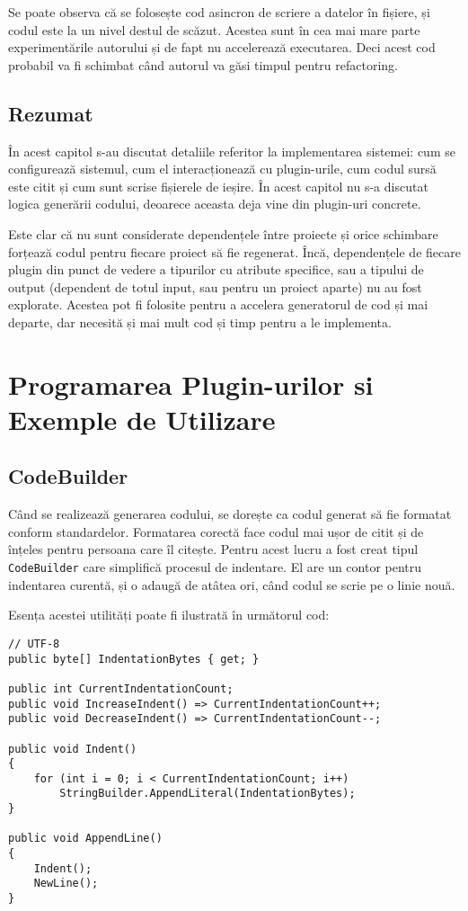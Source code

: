 \documentclass[a4paper,12pt]{report}
\begin{document}
Se poate observa că se folosește cod asincron de scriere a datelor în fișiere, și codul este la un nivel destul de scăzut.
Acestea sunt în cea mai mare parte experimentările autorului și de fapt nu accelerează executarea.
Deci acest cod probabil va fi schimbat când autorul va găsi timpul pentru refactoring.

\section{Rezumat}

În acest capitol s-au discutat detaliile referitor la implementarea sistemei: cum se configurează sistemul, cum el interacționează cu plugin-urile, cum codul sursă este citit și cum sunt scrise fișierele de ieșire.
În acest capitol nu s-a discutat logica generării codului, deoarece aceasta deja vine din plugin-uri concrete.

Este clar că nu sunt considerate dependențele între proiecte și orice schimbare forțează codul pentru fiecare proiect să fie regenerat.
Încă, dependențele de fiecare plugin din punct de vedere a tipurilor cu atribute specifice, sau a tipului de output (dependent de totul input, sau pentru un proiect aparte) nu au fost explorate.
Acestea pot fi folosite pentru a accelera generatorul de cod și mai departe, dar necesită și mai mult cod și timp pentru a le implementa.

\chapter{Programarea Plugin-urilor si Exemple de Utilizare}

\section{CodeBuilder}

Când se realizează generarea codului, se dorește ca codul generat să fie formatat conform standardelor.
Formatarea corectă face codul mai ușor de citit și de înțeles pentru persoana care îl citește.
Pentru acest lucru a fost creat tipul \texttt{CodeBuilder} care simplifică procesul de indentare.
El are un contor pentru indentarea curentă, și o adaugă de atâtea ori, când codul se scrie pe o linie nouă.

Esența acestei utilități poate fi ilustrată în următorul cod:

\begin{lstlisting}
// UTF-8
public byte[] IndentationBytes { get; }

public int CurrentIndentationCount;
public void IncreaseIndent() => CurrentIndentationCount++;
public void DecreaseIndent() => CurrentIndentationCount--;

public void Indent()
{
    for (int i = 0; i < CurrentIndentationCount; i++)
        StringBuilder.AppendLiteral(IndentationBytes);
}

public void AppendLine() 
{ 
    Indent();
    NewLine();
}
\end{lstlisting}
\end{document}
